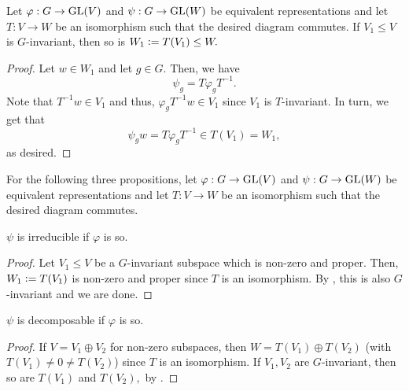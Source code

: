 \begin{lem} \label{lem:isopreservesinv}
	Let $\varphi:G \to \operatorname{GL}(V)$ and $\psi:G \to \operatorname{GL}(W)$ be equivalent representations and let $T: V \to W$ be an isomorphism such that the desired diagram commutes. If $V_1 \le V$ is $G$-invariant, then so is $W_1 \vcentcolon= T(V_1) \le W.$
\end{lem}
\begin{proof} 
	Let $w \in W_1$ and let $g \in G.$ Then, we have
	\begin{equation*} 
		\psi_g = T\varphi_gT^{-1}.
	\end{equation*}
	Note that $T^{-1}w \in V_1$ and thus, $\varphi_gT^{-1}w \in V_1$ since $V_1$ is $T$-invariant. In turn, we get that
	\begin{equation*} 
		\psi_gw = T\varphi_gT^{-1} \in T(V_1) = W_1,
	\end{equation*}
	as desired.
\end{proof}

For the following three propositions, let $\varphi:G \to \operatorname{GL}(V)$ and $\psi:G \to \operatorname{GL}(W)$ be equivalent representations and let $T: V \to W$ be an isomorphism such that the desired diagram commutes.

\begin{prop} \label{prop:irreducibleequiv}
	$\psi$ is irreducible if $\varphi$ is so.
\end{prop}
\begin{proof} 
	Let $V_1 \le V$ be a $G$-invariant subspace which is non-zero and proper. Then, $W_1 \vcentcolon= T(V_1)$ is non-zero and proper since $T$ is an isomorphism. By , this is also $G$-invariant and we are done.
\end{proof}

\begin{prop} \label{prop:decomposableequiv}
	$\psi$ is decomposable if $\varphi$ is so.
\end{prop}
\begin{proof} 
	If $V = V_1 \oplus V_2$ for non-zero subspaces, then $W = T(V_1) \oplus T(V_2)$ (with $T(V_1) \neq 0 \neq T(V_2)$) since $T$ is an isomorphism. If $V_1, V_2$ are $G$-invariant, then so are $T(V_1)$ and $T(V_2),$ by .
\end{proof}

